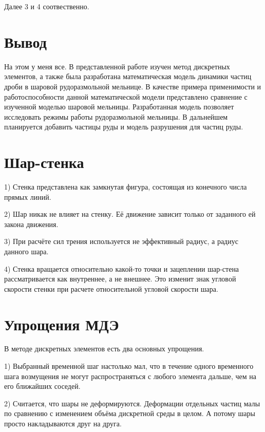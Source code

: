 \documentclass[a4paper]{article}
\begin{document}
Далее 3 и 4 соотвественно.


\section{Вывод}

На этом у меня все.
В представленной работе изучен метод дискретных элементов, а также была разработана математическая модель динамики частиц дроби в шаровой рудоразмольной мельнице.
В качестве примера применимости и работоспособности данной математической модели представлено сравнение с изученной моделью шаровой мельницы.
Разработанная модель позволяет исследовать режимы работы рудоразмольной мельницы.
В дальнейшем планируется добавить частицы руды и модель разрушения для частиц руды.


\section{Шар-стенка}

1) Стенка представлена как замкнутая фигура, состоящая из конечного числа прямых линий.

2) Шар никак не влияет на стенку. 
Её движение зависит только от заданного ей закона движения.

3) При расчёте сил трения используется не эффективный радиус, а радиус данного шара.

4) Стенка вращается относительно какой-то точки и зацеплении шар-стена рассматривается как внутреннее, а не внешнее. 
Это изменит знак угловой скорости стенки при расчете относительной угловой скорости шара.


\section{Упрощения МДЭ}

В методе дискретных элементов есть два основных упрощения.

1) Выбранный временной шаг настолько мал, что в течение одного временного шага возмущения не могут распространяться с любого элемента дальше, чем на его ближайших соседей. 

2) Считается, что шары не деформируются.
Деформации отдельных частиц малы по сравнению с изменением объёма дискретной среды в целом.
А потому шары просто накладываются друг на друга.
\end{document}
